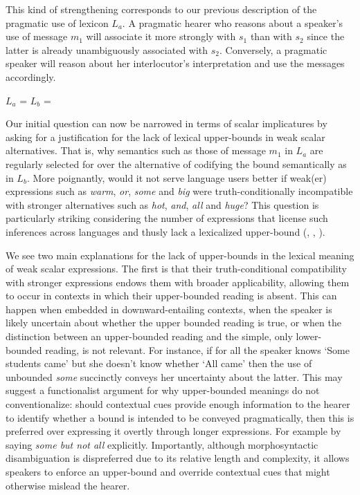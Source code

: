 \documentclass[a4paper]{article}
\begin{document}
This kind of strengthening corresponds to our previous description of the pragmatic use of lexicon $L_a$. A pragmatic hearer who reasons about a speaker's use of message $m_1$ will associate it more strongly with $s_1$ than with $s_2$ since the latter is already unambiguously associated with $s_2$. Conversely, a pragmatic speaker will reason about her interlocutor's interpretation and use the messages accordingly. 

\begin{centering}
$L_a$ =  \hspace{2cm} $L_b$ = \\[0.5cm]
\end{centering}

Our initial question can now be narrowed in terms of scalar implicatures by asking for a justification for the lack of lexical upper-bounds in weak scalar alternatives. That is, why semantics such as those of message $m_1$ in $L_a$ are regularly selected for over the alternative of codifying the bound semantically as in $L_b$. More poignantly, would it not serve language users better if weak(er) expressions such as {\em warm}, {\em or}, {\em some} and {\em big} were truth-conditionally incompatible with stronger alternatives such as {\em hot}, {\em and}, {\em all} and {\em huge}?  This question is particularly striking considering the number of expressions that license such inferences across languages and thusly lack a lexicalized upper-bound (\citealt{horn:1972}, \citealt[252-267]{horn:1984}, \citealt{traugott:2004,vdAuwera:2010}). 

We see two main explanations for the lack of upper-bounds in the lexical meaning of weak scalar expressions. The first is that their truth-conditional compatibility with stronger expressions endows them with broader applicability, allowing them to occur in contexts in which their upper-bounded reading is absent. This can happen when embedded in downward-entailing contexts, when the speaker is likely uncertain about whether the upper bounded reading is true, or when the distinction between an upper-bounded reading and the simple, only lower-bounded reading, is not relevant. For instance, if for all the speaker knows `Some students came' but she doesn't know whether `All came' then the use of unbounded {\em some} succinctly conveys her uncertainty about the latter. This may suggest a functionalist argument for why upper-bounded meanings do not conventionalize: should contextual cues provide enough information to the hearer to identify whether a bound is intended to be conveyed pragmatically, then this is preferred over expressing it overtly through longer expressions. For example by saying {\em some but not all} explicitly. Importantly, although morphosyntactic disambiguation is dispreferred due to its relative length and complexity, it allows speakers to enforce an upper-bound and override contextual cues that might otherwise mislead the hearer. 
\end{document}

